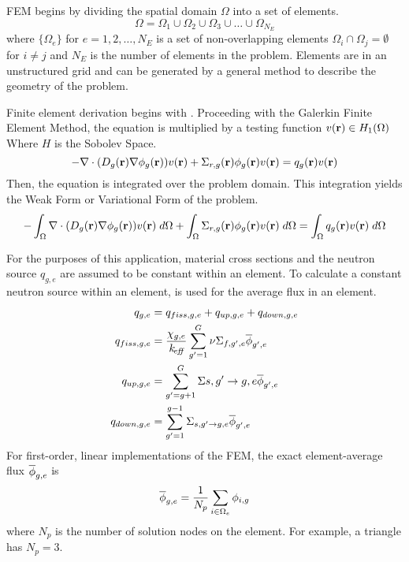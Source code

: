     FEM begins by dividing the spatial domain $\Omega$
    into a set of elements.
    \[ \Omega = \Omega_1 \cup \Omega_2 \cup \Omega_3 \cup \ldots \cup
      \Omega_{N_E} \]
    where $\{\Omega_e\}$ for $e = 1,2,\ldots,N_E$ is a set of
    non-overlapping elements $\Omega_i \cap \Omega_j = \emptyset$ for $i \ne j$ 
    and $N_E$ is the number of elements in the problem.
    Elements are in an unstructured grid and can be generated by a general
    method to describe the geometry of the problem.
    
    Finite element derivation begins with .
    Proceeding with the Galerkin Finite Element Method, the equation is 
    multiplied by a testing function $v(\mathbf{r}) \in H_1(\Omega)$ 
    Where $H$ is the Sobolev Space. 
    \begin{equation}
      -\mathbf{\nabla} \cdot (D_g(\mathbf{r}) \mathbf{\nabla} \phi_g(\mathbf{r})) v(\mathbf{r}) + 
        \Sigma_{r,g}(\mathbf{r}) \phi_g(\mathbf{r}) v(\mathbf{r}) =
        q_g(\mathbf{r}) v(\mathbf{r})
    \end{equation}
    Then, the equation is integrated over the problem domain. This integration
    yields the Weak Form or Variational Form of the problem.
    \begin{equation}
      - \int_{\Omega} \mathbf{\nabla} \cdot (D_g(\mathbf{r}) \mathbf{\nabla} \phi_g(\mathbf{r})) v(\mathbf{r}) \; d\Omega
        + \int_{\Omega} \Sigma_{r,g}(\mathbf{r}) \phi_g(\mathbf{r}) v(\mathbf{r}) \;d\Omega =
        \int_{\Omega} q_g(\mathbf{r}) v(\mathbf{r}) \;d\Omega
    \end{equation}
    
    For the purposes of this application, material cross sections and the
    neutron source $q_{g,e}$ are assumed to be constant within an element. 
    To calculate a constant neutron source within an element,  is
    used for the average flux in an element.
    \begin{align}
      q_{g,e} &= q_{fiss,g,e} + q_{up,g,e} + q_{down,g,e} \\
      \label{eq:qelement_fiss}
      q_{fiss,g,e} &= \frac{\chi_{g,e}}{k_{\!\mbox{\scriptsize \em eff}}} \sum_{g'=1}^G \nu
        \Sigma_{f,g',e} \overline{\phi}_{g',e} \\
      \label{eq:qelement_up}
      q_{up,g,e} &= \sum_{g'=g+1}^G \Sigma{s,g' \rightarrow g,e}
        \overline{\phi}_{g',e}\\
      \label{eq:qelement_down}
      q_{down,g,e} &= \sum_{g'=1}^{g-1} \Sigma_{s,g' \rightarrow g,e}
        \overline{\phi}_{g',e}
    \end{align}
    For first-order, linear implementations of the FEM, the exact
    element-average flux $\overline{\phi}_{g,e}$ is
    \begin{equation}
      \label{eq:phiavg}
      \overline{\phi}_{g,e} = \frac{1}{N_p} \sum_{i \in \Omega_e} \phi_{i,g}
    \end{equation}
    where $N_p$ is the number of solution nodes on the element. For example, a
    triangle has $N_p = 3$.

